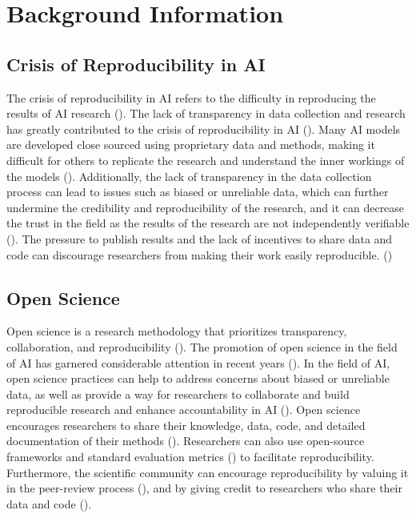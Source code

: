 
\section{Background Information}


\subsection{Crisis of Reproducibility in AI}
The crisis of reproducibility in AI refers to the difficulty in reproducing the results of AI research (\cite{gundersen2018reproducible}). The lack of transparency in data collection and research has greatly contributed to the crisis of reproducibility in AI (\cite{gundersen2018reproducible,hutson2018artificial,leakage-recrisis}). Many AI models are developed close sourced using proprietary data and methods, making it difficult for others to replicate the research and understand the inner workings of the models (\cite{gundersen2018reproducible,accountabilityInAi}). Additionally, the lack of transparency in the data collection process can lead to issues such as biased or unreliable data, which can further undermine the credibility and reproducibility of the research, and it can decrease the trust in the field as the results of the research are not independently verifiable  (\cite{accountabilityInAi,leakage-recrisis,scully-debt-ml}). The pressure to publish results and the lack of incentives to share data and code can discourage researchers from making their work easily reproducible. (\cite{psychology-reproducibility-crisis, friesike2015open,kwon2021incentive, ali2017motivating,o2017evaluation})


\subsection{Open Science}

Open science is a research methodology that prioritizes transparency, collaboration, and reproducibility (\cite{nielsen2011reinventing}). The promotion of open science in the field of AI has garnered considerable attention in recent years (\cite{accountabilityInAi,gundersen2018reproducible,leakage-recrisis,scully-debt-ml,stodden-towardreprodicibleresearch,coro2020open,braun2018open,hicks2021open,burgelman2019open}). In the field of AI, open science practices can help to address concerns about biased or unreliable data, as well as provide a way for researchers to collaborate and build reproducible research and enhance accountability in AI (\cite{accountabilityInAi,stodden-towardreprodicibleresearch}).  Open science encourages researchers to share their knowledge, data, code, and detailed documentation of their methods (\cite{hutson2018artificial,accountabilityInAi}). 
Researchers can also use open-source frameworks and standard evaluation metrics (\cite{gundersen2018reproducible}) to facilitate reproducibility. Furthermore, the scientific community can encourage reproducibility by valuing it in the peer-review process (\cite{scully-debt-ml}), and by giving credit to researchers who share their data and code (\cite{scully-debt-ml,credit-datasharing,stodden-towardreprodicibleresearch}).




